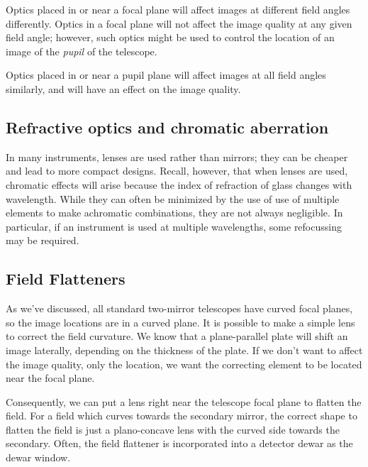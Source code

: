 \documentclass[12pt]{article}
\begin{document}
Optics placed in or near a focal plane will affect images at different
field angles differently. Optics in a focal plane will not affect the
image quality at any given field angle; however, such optics might be
used to control the location of an image of the \emph{pupil} of the
telescope.

Optics placed in or near a pupil plane will affect images at all field
angles similarly, and will have an effect on the image quality.

\subsection{Refractive optics and chromatic aberration}
In many instruments, lenses are used rather than mirrors; they can be
cheaper and lead to more compact designs. Recall, however, that when
lenses are used, chromatic effects will arise because the index of
refraction of glass changes with wavelength. While they can often be
minimized by the use of use of multiple elements to make achromatic
combinations, they are not always negligible. In particular, if an
instrument is used at multiple wavelengths, some refocussing may be
required.

\subsection{Field Flatteners}
As we've discussed, all standard two-mirror telescopes have curved
focal planes, so the image locations are in a curved plane.
It is possible to make a simple lens to correct the
field curvature. We know that a plane-parallel plate will shift an
image laterally, depending on the thickness of the plate. If we don't
want to affect the image quality, only the location, we want the
correcting element to be located near the focal plane.

Consequently, we can put a lens right near the telescope focal plane to
flatten the field. For a field which curves towards the secondary
mirror, the correct shape to flatten the field is just
a plano-concave lens with the curved side towards the secondary.
Often, the field flattener is incorporated into a detector dewar as
the dewar window.
\end{document}
